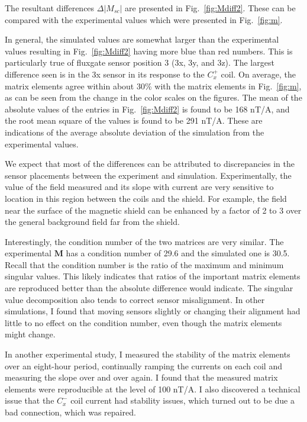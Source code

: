 The resultant differences $\Delta|M_{sc}|$ are presented in
Fig.~\ref{fig:Mdiff2}.  These can be compared with the experimental
values which were presented in Fig.~\ref{fig:m}.

In general, the simulated values are somewhat larger than the
experimental values resulting in Fig.~\ref{fig:Mdiff2} having more
blue than red numbers.  This is particularly true of fluxgate sensor
position 3 (3x, 3y, and 3z).  The largest difference seen is in the 3x
sensor in its response to the $C_x^+$ coil.  On average, the matrix
elements agree within about 30\% with the matrix elements in
Fig.~\ref{fig:m}, as can be seen from the change in the color scales
on the figures.  The mean of the absolute values of the entries in
Fig.~\ref{fig:Mdiff2} is found to be 168 nT/A, and the root mean
square of the values is found to be 291 nT/A.  These are indications
of the average absolute deviation of the simulation from the
experimental values.

We expect that most of the differences can be attributed to
discrepancies in the sensor placements between the experiment and
simulation.  Experimentally, the value of the field measured and its
slope with current are very sensitive to location in this region
between the coils and the shield.  For example, the field near the
surface of the magnetic shield can be enhanced by a factor of 2 to 3
over the general background field far from the shield.

Interestingly, the condition number of the two matrices are very
similar.  The experimental $\bm{M}$ has a condition number of 29.6 and the
simulated one is 30.5.  Recall that the condition number is the ratio
of the maximum and minimum singular values.  This likely indicates
that ratios of the important matrix elements are reproduced better
than the absolute difference would indicate.  The singular value
decomposition also tends to correct sensor misalignment.  In other
simulations, I found that moving sensors slightly or changing their
alignment had little to no effect on the condition number, even though
the matrix elements might change.

In another experimental study, I measured the stability of the matrix
elements over an eight-hour period, continually ramping the currents
on each coil and measuring the slope over and over again.  I found
that the measured matrix elements were reproducible at the level of
100 nT/A.  I also discovered a technical issue that the $C_x^-$ coil
current had stability issues, which turned out to be due a bad
connection, which was repaired.

